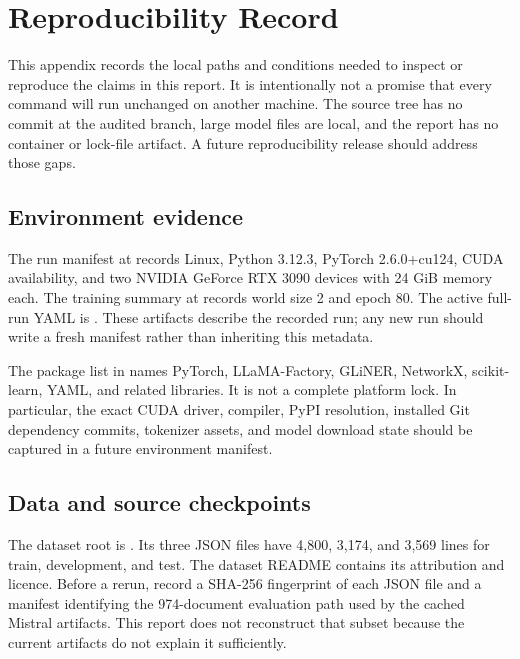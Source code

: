 \chapter{Reproducibility Record}
\label{app:reproducibility}

This appendix records the local paths and conditions needed to inspect or reproduce the claims in this report. It is intentionally not a promise that every command will run unchanged on another machine. The source tree has no commit at the audited branch, large model files are local, and the report has no container or lock-file artifact. A future reproducibility release should address those gaps.

\section{Environment evidence}

The run manifest at  records Linux, Python 3.12.3, PyTorch 2.6.0+cu124, CUDA availability, and two NVIDIA GeForce RTX 3090 devices with 24 GiB memory each. The training summary at  records world size 2 and epoch 80. The active full-run YAML is . These artifacts describe the recorded run; any new run should write a fresh manifest rather than inheriting this metadata.

The package list in  names PyTorch, LLaMA-Factory, GLiNER, NetworkX, scikit-learn, YAML, and related libraries. It is not a complete platform lock. In particular, the exact CUDA driver, compiler, PyPI resolution, installed Git dependency commits, tokenizer assets, and model download state should be captured in a future environment manifest.

\section{Data and source checkpoints}

The dataset root is . Its three JSON files have 4,800, 3,174, and 3,569 lines for train, development, and test. The dataset README contains its attribution and licence. Before a rerun, record a SHA-256 fingerprint of each JSON file and a manifest identifying the 974-document evaluation path used by the cached Mistral artifacts. This report does not reconstruct that subset because the current artifacts do not explain it sufficiently.

